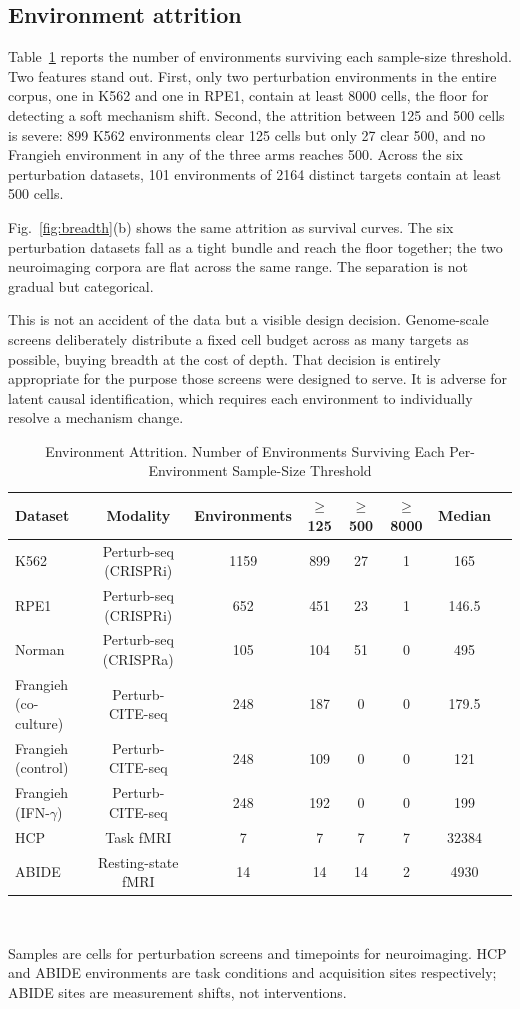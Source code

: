 \documentclass[journal,twoside,web]{ieeecolor}
\begin{document}
\subsection{Environment attrition}
Table~\ref{tab:attrition} reports the number of environments surviving each
sample-size threshold. Two features stand out. First, only two perturbation
environments in the entire corpus, one in K562 and one in RPE1, contain at
least 8000 cells, the floor for detecting a soft mechanism shift. Second, the
attrition between 125 and 500 cells is severe: 899 K562 environments clear 125
cells but only 27 clear 500, and no Frangieh environment in any of the three
arms reaches 500. Across the six perturbation datasets, 101 environments of
2164 distinct targets contain at least 500 cells.

Fig.~\ref{fig:breadth}(b) shows the same attrition as survival curves. The six
perturbation datasets fall as a tight bundle and reach the floor together; the
two neuroimaging corpora are flat across the same range. The separation is not
gradual but categorical.

This is not an accident of the data but a visible design decision.
Genome-scale screens deliberately distribute a fixed cell budget across as
many targets as possible, buying breadth at the cost of depth. That decision
is entirely appropriate for the purpose those screens were designed to serve.
It is adverse for latent causal identification, which requires each
environment to individually resolve a mechanism change.

\begin{table}[!t]
\caption{Environment Attrition. Number of Environments Surviving Each Per-Environment Sample-Size Threshold}
\label{tab:attrition}
\centering
\setlength{\tabcolsep}{6pt}
\begin{tabular}{lccccccc}
\hline
Dataset & Modality & Environments & $\geq$125 & $\geq$500 & $\geq$8000 & Median \\
\hline
K562 & Perturb-seq (CRISPRi) & 1159 & 899 & 27 & 1 & 165 \\
RPE1 & Perturb-seq (CRISPRi) & 652 & 451 & 23 & 1 & 146.5 \\
Norman & Perturb-seq (CRISPRa) & 105 & 104 & 51 & 0 & 495 \\
Frangieh (co-culture) & Perturb-CITE-seq & 248 & 187 & 0 & 0 & 179.5 \\
Frangieh (control) & Perturb-CITE-seq & 248 & 109 & 0 & 0 & 121 \\
Frangieh (IFN-$\gamma$) & Perturb-CITE-seq & 248 & 192 & 0 & 0 & 199 \\
HCP & Task fMRI & 7 & 7 & 7 & 7 & 32384 \\
ABIDE & Resting-state fMRI & 14 & 14 & 14 & 2 & 4930 \\
\hline
\end{tabular}
\\[2pt]
\parbox{\textwidth}{\footnotesize Samples are cells for perturbation screens and
timepoints for neuroimaging. HCP and ABIDE environments are task conditions
and acquisition sites respectively; ABIDE sites are measurement shifts, not
interventions.}
\end{table}
\end{document}
